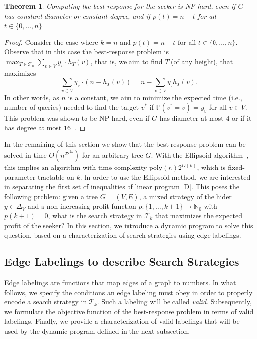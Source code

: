 \documentclass[11pt]{article}
\newtheorem{theorem}{Theorem}[section]
\newcommand{\N}{\mathbb{N}}
\newcommand{\BSTs}{\mathcal{T}}
\newcommand\+{\mkern2mu}
\newcommand{\T}{T}
\begin{document}
\begin{theorem}\label{thm:bestResponseHardness}
Computing the best-response for the seeker is NP-hard, even if $G$ has constant diameter or constant degree, and if $p(t)=n-t$ for all $t\in \{0,\ldots,n\}$.
\end{theorem}
\begin{proof}
Consider the case where $k=n$ and $p(t)=n-t$ for all $t\in \{0,\ldots,n\}$. Observe that in this case the best-response problem is $\max_{\T \in \mathcal{T}_n} \sum_{v \in V}y_{v} \cdot h_T(v)$, that is, we aim to find $\T$ (of any height), that maximizes 
$$
\sum_{v \in V}y_{v} \cdot (n-h_T(v)) = n-\sum_{v \in V}y_{v} h_T(v).
$$
In other words, as $n$ is a constant, we aim to minimize 
the expected time (i.e., number of queries) needed to find the target $v^*$ if $\mathbb{P}(v^*=v)=y_v$ for all $v\in V$. This problem was shown to be NP-hard, even if $G$ has diameter at most 4 or if it has degree at most 16~\cite{cicalese_complexity_2011}.   
\end{proof}

In the remaining of this section we show that the best-response problem can be solved in time $O(n^22^{2k})$ for an arbitrary tree $G$. With the Ellipsoid algorithm~\cite{grotschel_ellipsoid_1981}, this implies an algorithm with time complexity $\text{poly}(n)2^{O(k)}$, which is fixed-parameter tractable on $k$.
In order to use the Ellipsoid method, we are interested in separating the first set of inequalities of linear program [D]. This poses the following problem: given a tree $G=(V, E)$, a mixed strategy of the hider $y \in \Delta_V$ and a non-increasing profit function $p: \{1, \ldots, k+1\} \to \N_0$ with $p(k+1)=0$, what is the search strategy in $\BSTs_k$ that maximizes the expected profit of the seeker? In this section, we introduce a dynamic program to solve this question, based on a characterization of search strategies using edge labelings.

\subsection{Edge Labelings to describe Search Strategies} \label{sec:edge-labelings}

Edge labelings are functions that map edges of a graph to numbers. In what follows, we specify the conditions an edge labeling must obey in order to properly encode a search strategy in $\BSTs_k$. Such a labeling will be called \emph{valid}. Subsequently, we formulate the objective function of the best-response problem in terms of valid labelings. Finally, we provide a characterization of valid labelings that will be used by the dynamic program defined in the next subsection.
\end{document}

